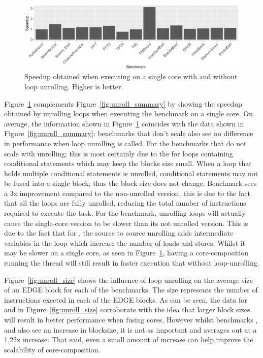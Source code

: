 \begin{figure}[t]
  \includegraphics[width=1\textwidth]{streamit-paper/graphics/unroll_speed_bars.pdf}
  \caption{Speedup obtained when executing on a single core with and without loop unrolling. Higher is better.}\label{fig:unroll_bars}
\end{figure}
Figure~\ref{fig:unroll_bars} complements Figure~\ref{fig:unroll_summary} by showing the speedup obtained by unrolling loops when executing the benchmark on a single core.
On average, the information shown in Figure~\ref{fig:unroll_bars} coincides with the data shown in Figure~\ref{fig:unroll_summary}: benchmarks that don't scale also see no difference in performance when loop unrolling is called.
For the benchmarks that do not scale with unrolling; this is most certainly due to the for loops containing conditional statements which may keep the blocks size small.
When a loop that holds multiple conditional statements is unrolled, conditional statements may not be fused into a single block; thus the block size does not change.
Benchmark  sees a 3x improvement compared to the non-unrolled version, this is due to the fact that all the loops are fully unrolled, reducing the total number of instructions required to execute the task.
For the  benchmark, unrolling loops will actually cause the single-core version to be slower than its not unrolled version.
This is due to the fact that for , the source to source unrolling adds intermediate variables in the loop which increase the number of loads and stores.
Whilst it may be slower on a single core, as seen in Figure~\ref{fig:unroll_bars}, having a core-composition running the thread will still result in faster execution that without loop-unrolling.

Figure~\ref{fig:unroll_size} shows the influence of loop unrolling on the average size of an EDGE block for each of the benchmarks.
The size represents the number of instructions exected in each of the EDGE blocks.
As can be seen, the data for  and  in Figure~\ref{fig:unroll_size} corroborate with the idea that larger block sizes will result in better performance when fusing cores.
However whilst benchmarks ,  and  also see an increase in blocksize, it is not as important and averages out at a 1.22x increase.
That said, even a small amount of increase can help improve the scalability of core-composition.

